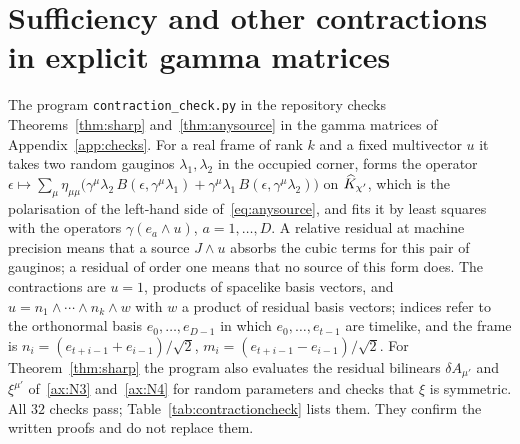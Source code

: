 \FloatBarrier

\section{Sufficiency and other contractions in explicit gamma matrices}
\label{app:contraction}

The program \texttt{contraction\_check.py} in the repository checks Theorems~\ref{thm:sharp} and~\ref{thm:anysource} in the gamma matrices of Appendix~\ref{app:checks}. For a real frame of rank $k$ and a fixed multivector $u$ it takes two random gauginos $\lambda_1,\lambda_2$ in the occupied corner, forms the operator $\epsilon\mapsto\sum_\mu\eta_{\mu\mu}\bigl(\gamma^\mu\lambda_2\,B(\epsilon,\gamma^\mu\lambda_1)+\gamma^\mu\lambda_1\,B(\epsilon,\gamma^\mu\lambda_2)\bigr)$ on $\widehat{K}_{\chi'}$, which is the polarisation of the left-hand side of~\eqref{eq:anysource}, and fits it by least squares with the operators $\gamma(e_a\wedge u)$, $a=1,\dots,D$. A relative residual at machine precision means that a source $J\wedge u$ absorbs the cubic terms for this pair of gauginos; a residual of order one means that no source of this form does. The contractions are $u=1$, products of spacelike basis vectors, and $u=n_1\wedge\cdots\wedge n_k\wedge w$ with $w$ a product of residual basis vectors; indices refer to the orthonormal basis $e_0,\dots,e_{D-1}$ in which $e_0,\dots,e_{t-1}$ are timelike, and the frame is $n_i=(e_{t+i-1}+e_{i-1})/\sqrt2$, $m_i=(e_{t+i-1}-e_{i-1})/\sqrt2$. For Theorem~\ref{thm:sharp} the program also evaluates the residual bilinears $\delta A_{\mu'}$ and $\xi^{\mu'}$ of~\ref{ax:N3} and~\ref{ax:N4} for random parameters and checks that $\xi$ is symmetric. All $32$ checks pass; Table~\ref{tab:contractioncheck} lists them. They confirm the written proofs and do not replace them.


